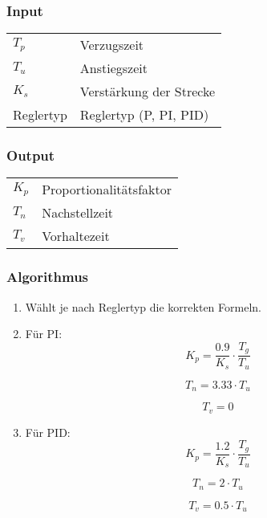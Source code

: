 \subsubsection*{Input}

\begin{tabular}{p{40mm}l}
    $ T_p $        & Verzugszeit \\
    $ T_u $        & Anstiegszeit \\
    $ K_s $        & Verst\"arkung der Strecke \\
      Reglertyp   & Reglertyp (P, PI, PID)
\end{tabular}

\subsubsection*{Output}
\begin{tabular}{p{40mm}l}
    $ K_p $ & Proportionalit\"atsfaktor \\
    $ T_n $ & Nachstellzeit \\
    $ T_v $ & Vorhaltezeit
\end{tabular}

\subsubsection*{Algorithmus}
\begin{enumerate}
    \item
        W\"ahlt je nach Reglertyp die korrekten Formeln.
    \item
        F\"ur PI:
        \begin{equation*}
            K_p= \frac{0.9}{K_s} \cdot \frac{T_g}{T_u}
        \end{equation*}

        \begin{equation*}
            T_n=3.33 \cdot T_u
        \end{equation*}

        \begin{equation*}
            T_v=0
        \end{equation*}
    \item
        F\"ur PID:
        \begin{equation*}
            K_p = \frac{1.2}{K_s} \cdot \frac{T_g}{T_u}
        \end{equation*}

        \begin{equation*}
            T_n=2 \cdot T_u
        \end{equation*}

        \begin{equation*}
            T_v = 0.5 \cdot T_u
        \end{equation*}
\end{enumerate}

